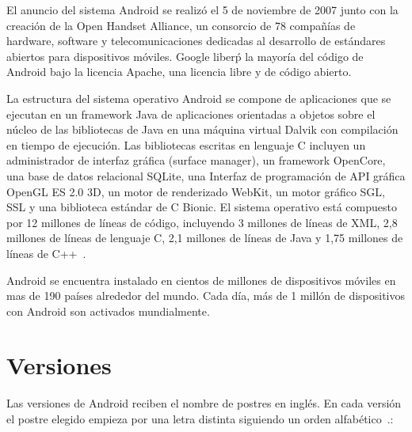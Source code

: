 El anuncio del sistema Android se realiz\'o el 5 de noviembre de 2007 junto con la creaci\'on de la Open Handset Alliance, un consorcio de 78 compañ\'ias de hardware, software y telecomunicaciones dedicadas al desarrollo de est\'andares abiertos para dispositivos m\'oviles. Google liber\'p la mayor\'ia del c\'odigo de Android\Si{\texttrademark} bajo la licencia Apache, una licencia libre y de c\'odigo abierto.

La estructura del sistema operativo Android\Si{\texttrademark} se compone de aplicaciones que se ejecutan en un framework Java de aplicaciones orientadas a objetos sobre el núcleo de las bibliotecas de Java en una m\'aquina virtual Dalvik con compilaci\'on en tiempo de ejecuci\'on. Las bibliotecas escritas en lenguaje C incluyen un administrador de interfaz gr\'afica (surface manager), un framework OpenCore, una base de datos relacional SQLite, una Interfaz de programaci\'on de \ac{API} gr\'afica OpenGL ES 2.0 3D, un motor de renderizado WebKit, un motor gr\'afico SGL, SSL y una biblioteca est\'andar de C Bionic. El sistema operativo est\'a compuesto por 12 millones de l\'ineas de c\'odigo, incluyendo 3 millones de l\'ineas de XML, 2,8 millones de l\'ineas de lenguaje C, 2,1 millones de l\'ineas de Java y 1,75 millones de l\'ineas de C++~\cite{wiki.android}.


Android se encuentra instalado en cientos de millones de dispositivos m\'oviles en mas de 190 pa\'ises alrededor del mundo. Cada d\'ia, m\'as de 1 mill\'on de dispositivos con Android son activados mundialmente.

\section{Versiones}
\label{sec:android.versions.1}

Las versiones de Android reciben el nombre de postres en ingl\'es. En cada versión el postre elegido empieza por una letra distinta siguiendo un orden alfab\'etico~\cite{and.dev.versions}.:

